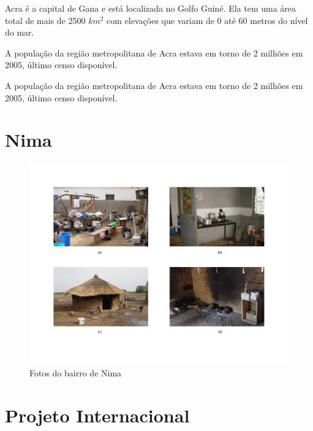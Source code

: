 Acra é a capital  de Gana e está localizada no Golfo Guiné. Ela tem uma área 
total de mais de 2500 $km^2$ com elevações que variam de 0 até 60 metros do nível 
do mar. 

A população da região metropolitana de Acra estava em torno de 2 milhões em 2005, 
último censo disponível.


A população da região metropolitana de Acra estava em torno de 2 milhões em 2005, 
último censo disponível.

\section{Nima}

\begin{figure}[H]
  \caption{Fotos do bairro de Nima}
  \includegraphics[scale=0.35]{../inputs/images/zheng/nima.pdf}
\end{figure}


\section{Projeto Internacional}


